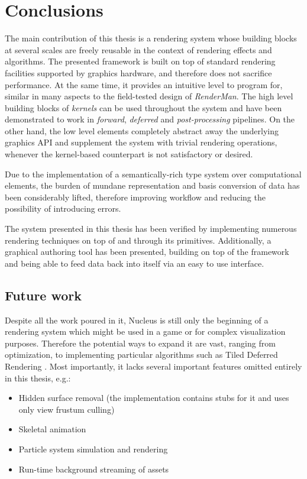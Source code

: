 
\chapter{ Conclusions }
\label{Chapter7}

The main contribution of this thesis is a rendering system whose building blocks at several scales are freely reusable in the context of rendering effects and algorithms. The presented framework is built on top of standard rendering facilities supported by graphics hardware, and therefore does not sacrifice performance. At the same time, it provides an intuitive level to program for, similar in many aspects to the field-tested design of \emph{RenderMan}. The high level building blocks of \emph{kernels} can be used throughout the system and have been demonstrated to work in \emph{forward}, \emph{deferred} and \emph{post-processing} pipelines. On the other hand, the low level elements completely abstract away the underlying graphics API and supplement the system with trivial rendering operations, whenever the kernel-based counterpart is not satisfactory or desired.

Due to the implementation of a semantically-rich type system over computational elements, the burden of mundane representation and basis conversion of data has been considerably lifted, therefore improving workflow and reducing the possibility of introducing errors.

The system presented in this thesis has been verified by implementing numerous rendering techniques on top of and through its primitives. Additionally, a graphical authoring tool has been presented, building on top of the framework and being able to feed data back into itself via an easy to use interface.

\section{Future work}

Despite all the work poured in it, Nucleus is still only the beginning of a rendering system which might be used in a game or for complex visualization purposes. Therefore the potential ways to expand it are vast, ranging from optimization, to implementing particular algorithms such as Tiled Deferred Rendering \cite{tiledDeferred}. Most importantly, it lacks several important features omitted entirely in this thesis, e.g.:
\begin{itemize}
\item Hidden surface removal (the implementation contains stubs for it and uses only view frustum culling)
\item Skeletal animation
\item Particle system simulation and rendering
\item Run-time background streaming of assets
\end{itemize}

